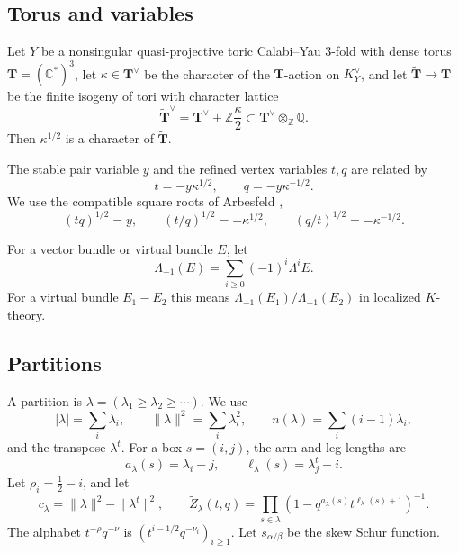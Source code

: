 \documentclass{amsart}
\theoremstyle{definition}
\numberwithin{equation}{section}
\newcommand{\C}{\mathbb C}
\newcommand{\Q}{\mathbb Q}
\newcommand{\Z}{\mathbb Z}
\begin{document}
\subsection{Torus and variables}
Let \(Y\) be a nonsingular quasi-projective toric Calabi--Yau 3-fold with dense torus \(\mathbf T=(\C^*)^3\), let \(\kappa\in\mathbf T^\vee\) be the character of the \(\mathbf T\)-action on \(K_Y^\vee\), and let \(\widetilde{\mathbf T}\to\mathbf T\) be the finite isogeny of tori with character lattice
\[
 \widetilde{\mathbf T}^{\vee}
 =\mathbf T^\vee+\Z\frac{\kappa}{2}
 \subset \mathbf T^\vee\otimes_{\Z}\Q.
\]
Then \(\kappa^{1/2}\) is a character of \(\widetilde{\mathbf T}\).

The stable pair variable \(y\) and the refined vertex variables \(t,q\) are related by
\begin{equation}
 t=-y\kappa^{1/2},\qquad q=-y\kappa^{-1/2}.
\label{eq:PT-refined-variables}
\end{equation}
We use the compatible square roots of Arbesfeld \cite{Arbesfeld},
\begin{equation}
 (tq)^{1/2}=y,\qquad
 (t/q)^{1/2}=-\kappa^{1/2},\qquad
 (q/t)^{1/2}=-\kappa^{-1/2}.
\label{eq:PT-refined-square-root-branches}
\end{equation}

For a vector bundle or virtual bundle \(E\), let
\[
 \Lambda_{-1}(E)=\sum_{i\geq0}(-1)^i\Lambda^iE.
\]
For a virtual bundle \(E_1-E_2\) this means \(\Lambda_{-1}(E_1)/\Lambda_{-1}(E_2)\) in localized \(K\)-theory.

\subsection{Partitions}
A partition is \(\lambda=(\lambda_1\geq\lambda_2\geq\cdots)\).  We use
\[
 |\lambda|=\sum_i\lambda_i,\qquad
 \|\lambda\|^2=\sum_i\lambda_i^2,\qquad
 n(\lambda)=\sum_i(i-1)\lambda_i,
\]
and the transpose \(\lambda^t\).  For a box \(s=(i,j)\), the arm and leg lengths are
\[
 a_\lambda(s)=\lambda_i-j,\qquad \ell_\lambda(s)=\lambda_j^t-i.
\]
Let \(\rho_i=\frac12-i\), and let
\[
 c_\lambda=\|\lambda\|^2-\|\lambda^t\|^2,
 \qquad
 \widetilde Z_\lambda(t,q)
 =\prod_{s\in\lambda}
  \left(1-q^{a_\lambda(s)}t^{\ell_\lambda(s)+1}\right)^{-1}.
\]
The alphabet \(t^{-\rho}q^{-\nu}\) is \((t^{i-1/2}q^{-\nu_i})_{i\geq1}\).  Let \(s_{\alpha/\beta}\) be the skew Schur function.
\end{document}
